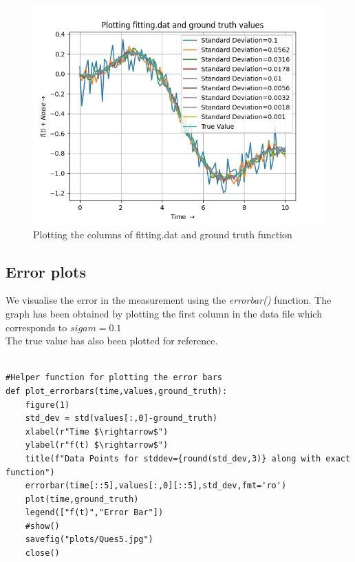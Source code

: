 \documentclass[11pt, a4paper]{article}
\begin{document}
\begin{figure}[!tbh]
   	\centering
   	\includegraphics[scale=0.7]{plots/Ques3_4.jpg}  %
   	\caption{Plotting the columns of fitting.dat and ground truth function}
   	\label{fig:Data plot}
   \end{figure} 

\subsection{Error plots}
We visualise the error in the measurement using the \textit{errorbar()} function.
The graph has been obtained by plotting the first column in the data file which corresponds to $sigam = 0.1$\\
The true value has also been plotted for reference.

\begin{lstlisting}

#Helper function for plotting the error bars
def plot_errorbars(time,values,ground_truth):
    figure(1)
    std_dev = std(values[:,0]-ground_truth)
    xlabel(r"Time $\rightarrow$")
    ylabel(r"f(t) $\rightarrow$")
    title(f"Data Points for stddev={round(std_dev,3)} along with exact function")
    errorbar(time[::5],values[:,0][::5],std_dev,fmt='ro')
    plot(time,ground_truth)
    legend(["f(t)","Error Bar"])
    #show()
    savefig("plots/Ques5.jpg")
    close()

\end{lstlisting}
\end{document}

